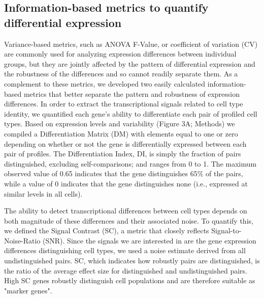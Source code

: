 \subsection{Information-based metrics to quantify differential expression}

Variance-based metrics, such as ANOVA F-Value, or coefficient of variation (CV) are commonly used for analyzing expression differences between individual groups, but they are jointly affected by the pattern of differential expression and the robustness of the differences and so cannot readily separate them. As a complement to these metrics, we developed two easily calculated information-based metrics that better separate the pattern and robustness of expression differences. In order to extract the transcriptional signals related to cell type identity, we quantified each gene's ability to differentiate each pair of profiled cell types. Based on expression levels and variability (Figure 3A; Methods) we compiled a Differentiation Matrix (DM) with elements equal to one or zero depending on whether or not the gene is differentially expressed between each pair of profiles. The Differentiation Index, DI, is simply the fraction of pairs distinguished, excluding self-comparisons; and ranges from 0 to 1. The maximum observed value of 0.65 indicates that the gene distinguishes 65\% of the pairs, while a value of 0 indicates that the gene distinguishes none (i.e., expressed at similar levels in all cells). 

The ability to detect transcriptional differences between cell types depends on both magnitude of these differences and their associated noise. To quantify this, we defined the Signal Contrast (SC), a metric that closely reflects Signal-to-Noise-Ratio (SNR). Since the signals we are interested in are the gene expression differences distinguishing cell types, we used a noise estimate derived from all undistinguished pairs. SC, which indicates how robustly pairs are distinguished, is the ratio of the average effect size for distinguished and undistinguished pairs. High SC genes robustly distinguish cell populations and are therefore suitable as "marker genes".

